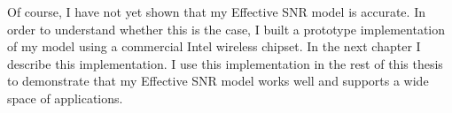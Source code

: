 Of course, I have not yet shown that my Effective SNR model is accurate. In order to understand whether this is the case, I built a prototype implementation of my model using a commercial Intel wireless chipset. In the next chapter I describe this implementation. I use this implementation in the rest of this thesis to demonstrate that my Effective SNR model works well and supports a wide space of applications.


\ifx\mainfile\undefined

\fi

